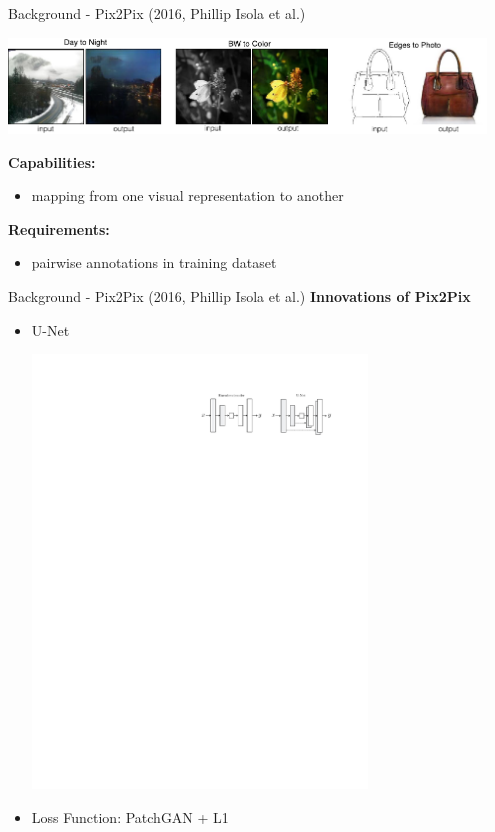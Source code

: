 \documentclass[aspectratio=169]{beamer}
\begin{document}
\begin{frame}{Background - Pix2Pix (2016, Phillip Isola et al.)}
\vspace{-1em}
\begin{center}
\includegraphics[width=0.95\textwidth]{assets/pix2pix_examples_small.pdf}
\end{center}
\textbf{Capabilities:}
\begin{itemize}
\item mapping from one visual representation to another
\end{itemize}
\textbf{Requirements:}
\begin{itemize}
\item pairwise annotations in training dataset
\end{itemize}
\end{frame}



\begin{frame}{Background - Pix2Pix (2016, Phillip Isola et al.)}
\vspace{-1em}
\textbf{Innovations of Pix2Pix}
\vspace{1em}
\begin{itemize}
\item U-Net\\
\begin{center}
\includegraphics[width=0.7\textwidth]{../thesis/assets/pix2pix_unet.pdf}
\end{center}
\item Loss Function: PatchGAN + L1
\end{itemize}
\end{frame}
\end{document}
